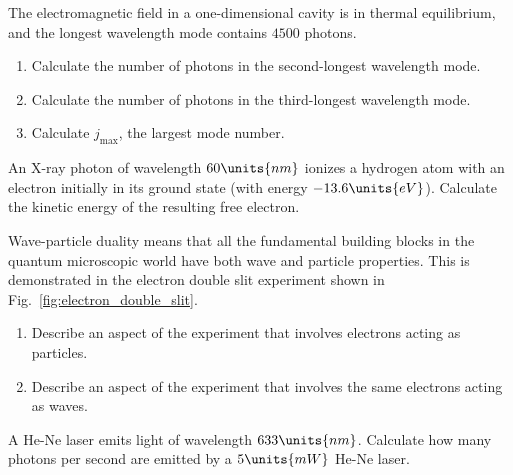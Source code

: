 \begin{problem}
The electromagnetic field in a one-dimensional cavity is in thermal
equilibrium, and the longest wavelength mode contains $4500$ photons.
\begin{enumerate}
\item Calculate the number of photons in the second-longest wavelength
mode.
\item Calculate the number of photons in the third-longest wavelength
mode.
\item Calculate $j_\text{max}$, the largest mode number.
\end{enumerate}
\end{problem}


\begin{problem}
An X-ray photon of wavelength $60\units{nm}$ ionizes a hydrogen atom
with an electron initially in its ground state (with energy $-13.6\units{eV}$).
Calculate the kinetic energy of the resulting free electron.
\label{prob:IonizeHAtom}
\end{problem}

\begin{problem}
Wave-particle duality means that all the fundamental building blocks
in the quantum microscopic world have both wave and particle
properties.  This is demonstrated in the electron double slit
experiment shown in Fig.~\ref{fig:electron_double_slit}.

\begin{enumerate}
\item Describe an aspect of the experiment that involves electrons
  acting as particles.
\item Describe an aspect of the experiment that involves the same
electrons acting as waves.
\end{enumerate}
\end{problem}

\begin{problem}
A He-Ne laser emits light of wavelength $633\units{nm}$.  Calculate
how many photons per second are emitted by a $5\units{mW}$ He-Ne
laser.
\end{problem}

